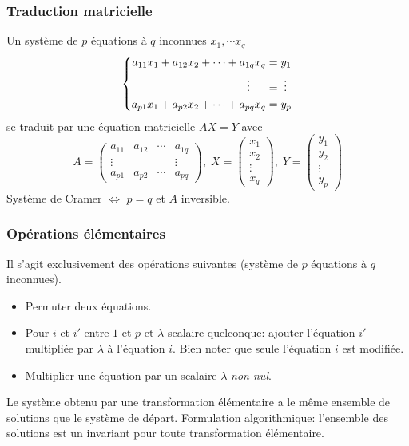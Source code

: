 \begin{frame}
  \frametitle{Traduction matricielle}
Un système de $p$ équations à $q$ inconnues $x_1,\cdots x_q$
\begin{displaymath}
\left\lbrace 
\begin{aligned}
  a_{1 1}x_1 + a_{1 2}x_2 + \cdots + a_{1 q}x_q &= y_1\\
  \vdots\hspace{0.5cm} &= \; \vdots \\
  a_{p 1}x_1 + a_{p 2}x_2 + \cdots + a_{p q}x_q &= y_p
\end{aligned}
\right. 
\end{displaymath}
se traduit par une équation matricielle $A X = Y$ avec 
\begin{displaymath}
A = 
\begin{pmatrix}
  a_{1 1} & a_{1 2} & \cdots & a_{1 q}\\
  \vdots  &         &        & \vdots \\
  a_{p 1} & a_{p 2} & \cdots & a_{p q}
\end{pmatrix},
\;
X = 
\begin{pmatrix}
  x_1 \\ x_2 \\ \vdots \\ x_q
\end{pmatrix},
\;
Y = 
\begin{pmatrix}
  y_1 \\ y_2 \\ \vdots \\ y_p
\end{pmatrix}
\end{displaymath}
Système de Cramer $\Leftrightarrow$ $p=q$ et $A$ inversible.

\end{frame}
\begin{frame}
  \frametitle{Opérations élémentaires}
Il s'agit exclusivement des opérations suivantes (système de $p$ équations à $q$ inconnues).
\begin{itemize}
 \item Permuter deux équations.
 \item Pour $i$ et $i'$ entre $1$ et $p$ et $\lambda$ scalaire quelconque: ajouter l'équation $i'$ multipliée par $\lambda$ à l'équation $i$. Bien noter que seule l'équation $i$ est modifiée.
 \item Multiplier une équation par un scalaire $\lambda$ \emph{non nul}.
\end{itemize}
Le système obtenu par une transformation élémentaire a le même ensemble de solutions que le système de départ.\newline
Formulation algorithmique: l'ensemble des solutions est un invariant pour toute transformation élémentaire.
\end{frame}

